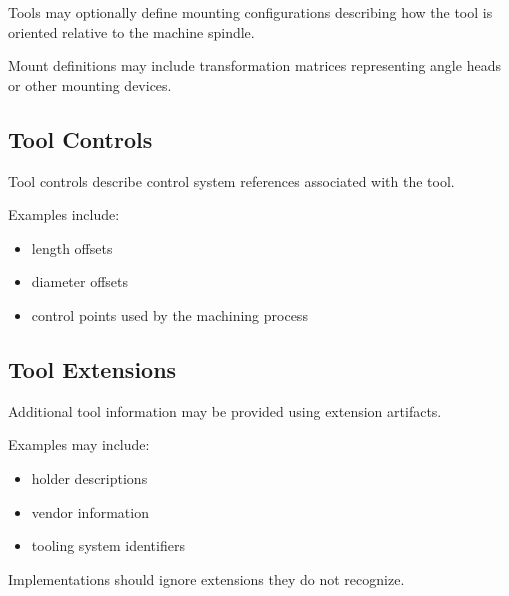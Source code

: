 Tools may optionally define mounting configurations describing how the tool is oriented relative to the machine spindle.

Mount definitions may include transformation matrices representing angle heads or other mounting devices.

\subsection{Tool Controls}

Tool controls describe control system references associated with the tool.

Examples include:

\begin{itemize}
\item length offsets
\item diameter offsets
\item control points used by the machining process
\end{itemize}

\subsection{Tool Extensions}

Additional tool information may be provided using extension artifacts.

Examples may include:

\begin{itemize}
\item holder descriptions
\item vendor information
\item tooling system identifiers
\end{itemize}

Implementations should ignore extensions they do not recognize.
